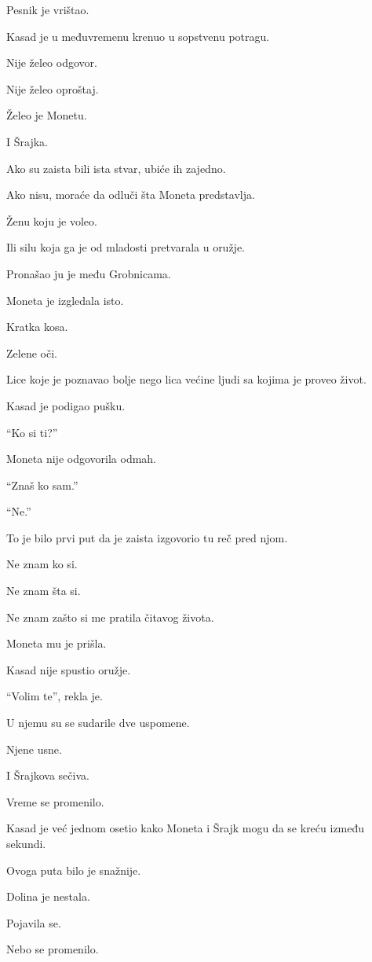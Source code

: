 Pesnik je vrištao.

\bigskip

Kasad je u međuvremenu krenuo u sopstvenu potragu.

Nije želeo odgovor.

Nije želeo oproštaj.

Želeo je Monetu.

I Šrajka.

Ako su zaista bili ista stvar, ubiće ih zajedno.

Ako nisu, moraće da odluči šta Moneta predstavlja.

Ženu koju je voleo.

Ili silu koja ga je od mladosti pretvarala u oružje.

\bigskip

Pronašao ju je među Grobnicama.

Moneta je izgledala isto.

Kratka kosa.

Zelene oči.

Lice koje je poznavao bolje nego lica većine ljudi sa kojima je proveo život.

Kasad je podigao pušku.

``Ko si ti?''

Moneta nije odgovorila odmah.

``Znaš ko sam.''

``Ne.''

To je bilo prvi put da je zaista izgovorio tu reč pred njom.

Ne znam ko si.

Ne znam šta si.

Ne znam zašto si me pratila čitavog života.

Moneta mu je prišla.

Kasad nije spustio oružje.

``Volim te'', rekla je.

U njemu su se sudarile dve uspomene.

Njene usne.

I Šrajkova sečiva.

\bigskip

Vreme se promenilo.

Kasad je već jednom osetio kako Moneta i Šrajk mogu da se kreću između sekundi.

Ovoga puta bilo je snažnije.

Dolina je nestala.

Pojavila se.

Nebo se promenilo.

